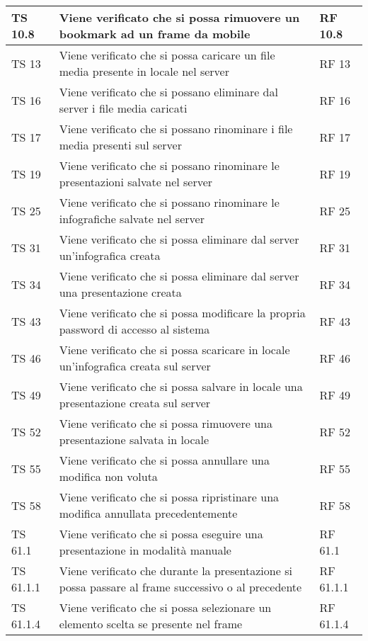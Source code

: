 {{\begin{longtable} [c]{| p{3cm} | p{6cm} |p{3cm}|}
			\hline
			TS 10.8 & Viene verificato che si possa rimuovere un bookmark\ped{g} ad un frame\ped{g} da mobile & RF 10.8\\
			\hline
			TS 13 & Viene verificato che si possa caricare un file media presente in locale nel server & RF 13\\
			\hline
			TS 16 & Viene verificato che si possano eliminare dal server\ped{g} i file media caricati & RF 16\\
			\hline
			TS 17 & Viene verificato che si possano rinominare i file media presenti sul server & RF 17\\
			\hline
			TS 19 & Viene verificato che si possano rinominare le presentazioni salvate nel server & RF 19\\
			\hline
			TS 25 & Viene verificato che si possano rinominare le infografiche salvate nel server & RF 25\\
			\hline
			TS 31 & Viene verificato che si possa eliminare dal server un'infografica creata & RF 31\\
			\hline
			TS 34 & Viene verificato che si possa eliminare dal server\ped{g} una presentazione creata & RF 34\\
			\hline
			TS 43 & Viene verificato che si possa modificare la propria password di accesso al sistema & RF 43\\
			\hline
			TS 46 & Viene verificato che si possa scaricare in locale un'infografica\ped{g} creata sul server\ped{g} & RF 46\\
			\hline
			TS 49 & Viene verificato che si possa salvare in locale una presentazione creata sul server\ped{g} & RF 49\\
			\hline
			TS 52 & Viene verificato che si possa rimuovere una presentazione salvata in locale & RF 52\\
			\hline
			TS 55 & Viene verificato che si possa annullare una modifica non voluta & RF 55\\
			\hline
			TS 58 & Viene verificato che si possa ripristinare una modifica annullata precedentemente  & RF 58\\
			\hline
			TS 61.1 & Viene verificato che si possa eseguire una presentazione in modalità manuale & RF 61.1\\
			\hline
			TS 61.1.1 & Viene verificato che durante la presentazione si possa passare al frame\ped{g} successivo o al precedente & RF 61.1.1\\
			\hline
			TS 61.1.4 & Viene verificato che si possa selezionare un elemento scelta\ped{g} se presente nel frame\ped{g} & RF 61.1.4\\

\end{longtable}}}
